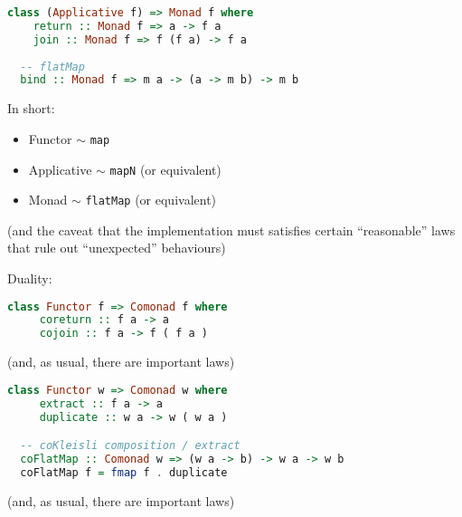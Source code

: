 \documentclass[10pt]{beamer}
\begin{document}
\begin{frame}[fragile]
  \begin{lstlisting}[language=haskell, basicstyle=\ttfamily]
  class (Applicative f) => Monad f where 
    return :: Monad f => a -> f a 
    join :: Monad f => f (f a) -> f a 
  
  -- flatMap
  bind :: Monad f => m a -> (a -> m b) -> m b 
  \end{lstlisting}
\end{frame}

\begin{frame}[fragile]
  In short:
  \begin{itemize}
    \item Functor $\sim$ \verb|map| 
    \item Applicative $\sim$  \verb|mapN|  (or equivalent) 
    \item Monad $\sim$  \verb|flatMap|  (or equivalent) 
  \end{itemize}

  (and the caveat that the implementation must satisfies certain ``reasonable'' laws that rule out ``unexpected'' behaviours)
\end{frame}

\begin{frame}[fragile]
  Duality:
  \begin{lstlisting}[language=haskell, basicstyle=\ttfamily]
  class Functor f => Comonad f where 
     coreturn :: f a -> a 
     cojoin :: f a -> f ( f a ) 
  \end{lstlisting}
  (and, as usual, there are important laws) 
\end{frame}

\begin{frame}[fragile]
  \begin{lstlisting}[language=haskell, basicstyle=\ttfamily]
  class Functor w => Comonad w where 
     extract :: f a -> a 
     duplicate :: w a -> w ( w a ) 

  -- coKleisli composition / extract
  coFlatMap :: Comonad w => (w a -> b) -> w a -> w b
  coFlatMap f = fmap f . duplicate
  \end{lstlisting}
  (and, as usual, there are important laws) 
\end{frame}
\end{document}
